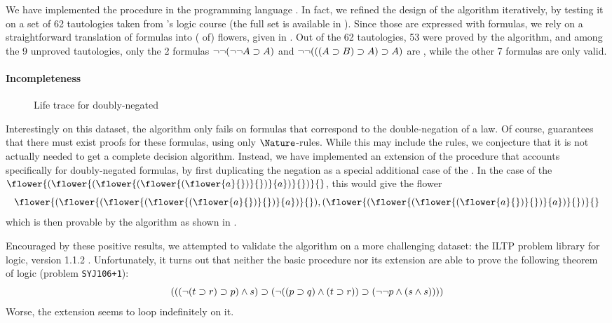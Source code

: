 \begin{scope}
We have implemented the  procedure in the  programming
language \cite{flower-auto}. In fact, we refined the design of the algorithm
iteratively, by testing it on a set of 62 tautologies taken from 's logic
course \cite{edukera} (the full set is available in
). Since those are expressed with  formulas,
we rely on a straightforward translation of formulas into ( of) flowers,
given in . Out of the 62 tautologies, 53 were proved by
the algorithm, and among the 9 unproved tautologies, only the 2 formulas
$\neg\neg(\neg\neg A \supset A)$ and $\neg\neg(((A \supset B) \supset A) \supset A)$ are
 , while the other 7 formulas are only  valid.

\paragraph{Incompleteness}

\begin{figure*}
  
  \caption{Life trace for doubly-negated }
\end{figure*}

Interestingly on this dataset, the algorithm only fails on formulas that
correspond to the double-negation of a  law. Of course,
 guarantees that there must exist proofs for these
formulas, using only $\Nature$-rules. While this may include the 
rules, we conjecture that it is not actually needed to get a complete decision
algorithm. Instead, we have implemented an extension of the 
procedure that accounts specifically for doubly-negated formulas, by first
duplicating the  negation as a special additional case of the
. In the case of the 
$\flower{(\flower{(\flower{(\flower{(\flower{a}{})}{})}{a})}{})}{}$, this would
give the flower
$$\flower{(\flower{(\flower{(\flower{(\flower{a}{})}{})}{a})}{}),
(\flower{(\flower{(\flower{(\flower{a}{})}{})}{a})}{})}{}$$
which is then provable by the algorithm as shown in .

Encouraged by these positive results, we attempted to validate the algorithm on
a more challenging dataset: the ILTP problem library for  logic,
version 1.1.2 . Unfortunately, it turns out that
neither the basic  procedure nor its extension are able to prove
the following theorem of  logic (problem \texttt{SYJ106+1}):
$$(((\neg (t \supset r) \supset p) \land s) \supset (\neg ((p \supset q) \land (t \supset
r)) \supset (\neg \neg p \land (s \land s))))$$
Worse, the extension seems to loop indefinitely on it.


\end{scope}
